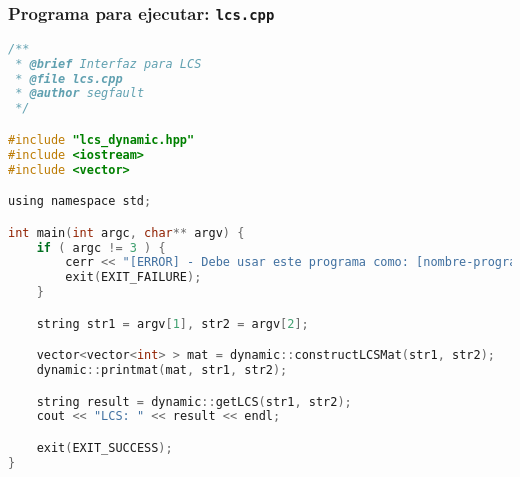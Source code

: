 \documentclass[10pt, a4paper]{article}
\theoremstyle{theorem-style}
\theoremstyle{theorem-style}
\theoremstyle{definition-style}
\theoremstyle{remark-style}
\theoremstyle{example-style}
\theoremstyle{definition-style}
\theoremstyle{remark-style}
\begin{document}
\subsubsection*{Programa para ejecutar: \texttt{lcs.cpp}}
\begin{lstlisting}[language=C]
/**
 * @brief Interfaz para LCS
 * @file lcs.cpp
 * @author segfault
 */

#include "lcs_dynamic.hpp"
#include <iostream>
#include <vector>

using namespace std;

int main(int argc, char** argv) {
    if ( argc != 3 ) {
        cerr << "[ERROR] - Debe usar este programa como: [nombre-programa] <str1> <str2>\n";
        exit(EXIT_FAILURE);
    }

    string str1 = argv[1], str2 = argv[2];

    vector<vector<int> > mat = dynamic::constructLCSMat(str1, str2);
    dynamic::printmat(mat, str1, str2);

    string result = dynamic::getLCS(str1, str2);
    cout << "LCS: " << result << endl;

    exit(EXIT_SUCCESS);
}
\end{lstlisting}
\end{document}
